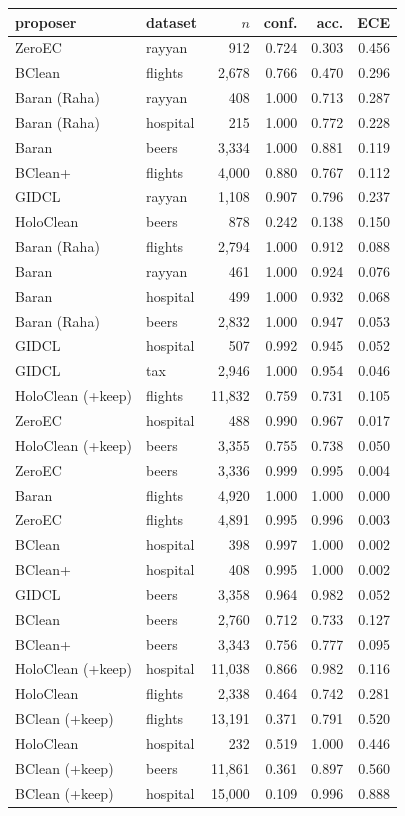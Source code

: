 \begin{tabular}{llrrrr}
\toprule
proposer & dataset & $n$ & conf. & acc. & ECE \\
\midrule
ZeroEC & rayyan & 912 & 0.724 & 0.303 & 0.456 \\
BClean & flights & 2,678 & 0.766 & 0.470 & 0.296 \\
Baran (Raha) & rayyan & 408 & 1.000 & 0.713 & 0.287 \\
Baran (Raha) & hospital & 215 & 1.000 & 0.772 & 0.228 \\
Baran & beers & 3,334 & 1.000 & 0.881 & 0.119 \\
BClean+ & flights & 4,000 & 0.880 & 0.767 & 0.112 \\
GIDCL & rayyan & 1,108 & 0.907 & 0.796 & 0.237 \\
HoloClean & beers & 878 & 0.242 & 0.138 & 0.150 \\
Baran (Raha) & flights & 2,794 & 1.000 & 0.912 & 0.088 \\
Baran & rayyan & 461 & 1.000 & 0.924 & 0.076 \\
Baran & hospital & 499 & 1.000 & 0.932 & 0.068 \\
Baran (Raha) & beers & 2,832 & 1.000 & 0.947 & 0.053 \\
GIDCL & hospital & 507 & 0.992 & 0.945 & 0.052 \\
GIDCL & tax & 2,946 & 1.000 & 0.954 & 0.046 \\
HoloClean (+keep) & flights & 11,832 & 0.759 & 0.731 & 0.105 \\
ZeroEC & hospital & 488 & 0.990 & 0.967 & 0.017 \\
HoloClean (+keep) & beers & 3,355 & 0.755 & 0.738 & 0.050 \\
ZeroEC & beers & 3,336 & 0.999 & 0.995 & 0.004 \\
Baran & flights & 4,920 & 1.000 & 1.000 & 0.000 \\
ZeroEC & flights & 4,891 & 0.995 & 0.996 & 0.003 \\
BClean & hospital & 398 & 0.997 & 1.000 & 0.002 \\
BClean+ & hospital & 408 & 0.995 & 1.000 & 0.002 \\
GIDCL & beers & 3,358 & 0.964 & 0.982 & 0.052 \\
BClean & beers & 2,760 & 0.712 & 0.733 & 0.127 \\
BClean+ & beers & 3,343 & 0.756 & 0.777 & 0.095 \\
HoloClean (+keep) & hospital & 11,038 & 0.866 & 0.982 & 0.116 \\
HoloClean & flights & 2,338 & 0.464 & 0.742 & 0.281 \\
BClean (+keep) & flights & 13,191 & 0.371 & 0.791 & 0.520 \\
HoloClean & hospital & 232 & 0.519 & 1.000 & 0.446 \\
BClean (+keep) & beers & 11,861 & 0.361 & 0.897 & 0.560 \\
BClean (+keep) & hospital & 15,000 & 0.109 & 0.996 & 0.888 \\
\bottomrule
\end{tabular}
